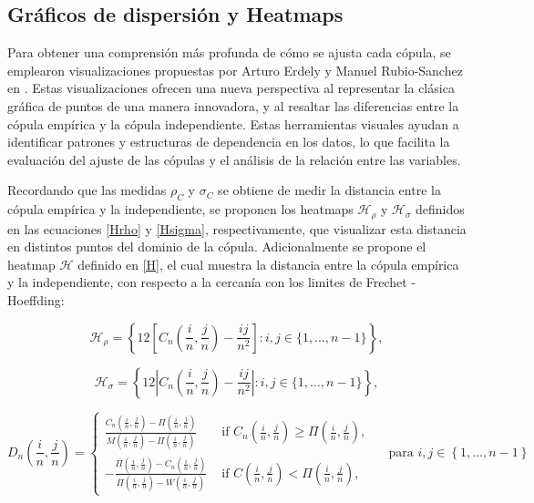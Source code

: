 
\subsection{Gráficos de dispersión y Heatmaps}

Para obtener una comprensión más profunda de cómo se ajusta cada cópula, se emplearon visualizaciones propuestas por Arturo Erdely y Manuel Rubio-Sanchez en \cite{Erdely2022}. Estas visualizaciones ofrecen una nueva perspectiva al representar la clásica gráfica de puntos de una manera innovadora, y al resaltar las diferencias entre la cópula empírica y la cópula independiente. Estas herramientas visuales ayudan a identificar patrones y estructuras de dependencia en los datos, lo que facilita la evaluación del ajuste de las cópulas y el análisis de la relación entre las variables. 

Recordando que las medidas $\rho_C$ y $\sigma_C$ se obtiene de medir la distancia entre la cópula empírica y la independiente, se proponen los heatmaps $\mathscr{H}_\rho$ y $\mathscr{H}_\sigma$ definidos en las ecuaciones \eqref{Hrho} y \eqref{Hsigma}, respectivamente, que visualizar esta distancia en distintos puntos del dominio de la cópula. Adicionalmente se propone el heatmap $\mathscr{H}$ definido en \eqref{H}, el cual muestra la distancia entre la cópula empírica y la independiente, con respecto a la cercanía con los limites de Frechet -Hoeffding:

\begin{equation}\label{Hrho}
    \mathscr{H}_\rho=\left\{12\left[C_n\left(\frac{i}{n}, \frac{j}{n}\right)-\frac{i j}{n^2}\right]: i, j \in\{1, \ldots, n-1\}\right\},
\end{equation}

\begin{equation}\label{Hsigma}
    \mathscr{H}_\sigma = \left\{12\left|C_n\left( \frac{i}{n}, \frac{j}{n}\right)-\frac{i j}{n^2}\right|: i, j \in\{1, \ldots, n-1\}\right\},
\end{equation}


\begin{equation}\label{D}
    D_n\left(\frac{i}{n}, \frac{j}{n}\right)=\left\{\begin{array}{cc}
\frac{C_n\left(\frac{i}{n}, \frac{j}{n}\right)-\Pi\left(\frac{i}{n}, \frac{j}{n}\right)}{M\left(\frac{i}{n}, \frac{j}{n}\right)-\Pi\left(\frac{i}{n}, \frac{j}{n}\right)} & \text { if } C_n\left(\frac{i}{n}, \frac{j}{n}\right) \geq \Pi\left(\frac{i}{n}, \frac{j}{n}\right), \\
-\frac{\Pi\left(\frac{i}{n}, \frac{j}{n}\right)-C_n\left(\frac{i}{n}, \frac{j}{n}\right)}{\Pi\left(\frac{i}{n}, \frac{j}{n}\right)-W\left(\frac{i}{n}, \frac{j}{n}\right)} & \text { if } C\left(\frac{i}{n}, \frac{j}{n}\right)<\Pi\left(\frac{i}{n}, \frac{j}{n}\right),
\end{array}\right. \quad \text{ para } i,j \in  \left\{ 1, \dots, n-1 \right\} 
\end{equation}

